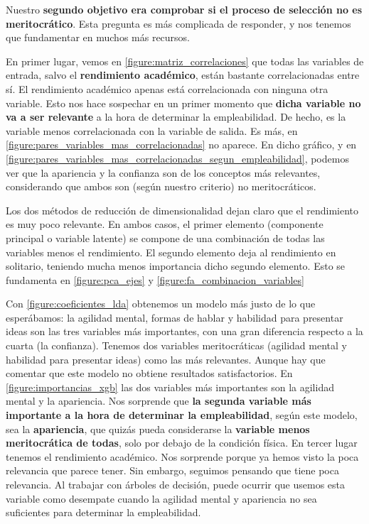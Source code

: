 \documentclass[11pt]{article}
\begin{document}
Nuestro \textbf{segundo objetivo era comprobar si el proceso de selección no es meritocrático}. Esta pregunta es más complicada de responder, y nos tenemos que fundamentar en muchos más recursos.

En primer lugar, vemos en \ref{figure:matriz_correlaciones} que todas las variables de entrada, salvo el \textbf{rendimiento académico}, están bastante correlacionadas entre sí. El rendimiento académico apenas está correlacionada con ninguna otra variable. Esto nos hace sospechar en un primer momento que \textbf{dicha variable no va a ser relevante} a la hora de determinar la empleabilidad. De hecho, es la variable menos correlacionada con la variable de salida. Es más, en \ref{figure:pares_variables_mas_correlacionadas} no aparece. En dicho gráfico, y en \ref{figure:pares_variables_mas_correlacionadas_segun_empleabilidad}, podemos ver que la apariencia y la confianza son de los conceptos más relevantes, considerando que ambos son (según nuestro criterio) no meritocráticos.

Los dos métodos de reducción de dimensionalidad dejan claro que el rendimiento es muy poco relevante. En ambos casos, el primer elemento (componente principal o variable latente) se compone de una combinación de todas las variables menos el rendimiento. El segundo elemento deja al rendimiento en solitario, teniendo mucha menos importancia dicho segundo elemento. Esto se fundamenta en \ref{figure:pca_ejes} y \ref{figure:fa_combinacion_variables}

Con \ref{figure:coeficientes_lda} obtenemos un modelo más justo de lo que esperábamos: la agilidad mental, formas de hablar y habilidad para presentar ideas son las tres variables más importantes, con una gran diferencia respecto a la cuarta (la confianza). Tenemos dos variables meritocráticas (agilidad mental y habilidad para presentar ideas) como las más relevantes. Aunque hay que comentar que este modelo no obtiene resultados satisfactorios. En \ref{figure:importancias_xgb} las dos variables más importantes son la agilidad mental y la apariencia. Nos sorprende que \textbf{la segunda variable más importante a la hora de determinar la empleabilidad}, según este modelo, sea la \textbf{apariencia}, que quizás pueda considerarse la \textbf{variable menos meritocrática de todas}, solo por debajo de la condición física. En tercer lugar tenemos el rendimiento académico. Nos sorprende porque ya hemos visto la poca relevancia que parece tener. Sin embargo, seguimos pensando que tiene poca relevancia. Al trabajar con árboles de decisión, puede ocurrir que usemos esta variable como desempate cuando la agilidad mental y apariencia no sea suficientes para determinar la empleabilidad.
\end{document}
